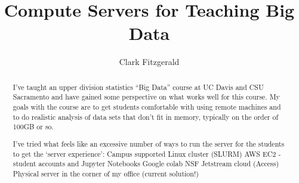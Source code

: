 \documentclass{article}
\title{Compute Servers for Teaching Big Data}
\author{Clark Fitzgerald}
\begin{document}
\maketitle

\begin{abstract}

I’ve taught an upper division statistics ``Big Data'' course at UC Davis and CSU Sacramento and have gained some perspective on what works well for this course.
My goals with the course are to get students comfortable with using remote machines and to do realistic analysis of data sets that don’t fit in memory, typically on the order of 100GB or so.
 
I’ve tried what feels like an excessive number of ways to run the server for the students to get the `server experience':
Campus supported Linux cluster (SLURM)
AWS EC2 - student accounts and Jupyter Notebooks
Google colab
NSF Jetstream cloud (Access)
Physical server in the corner of my office (current solution!)

\end{abstract}
\end{document}
